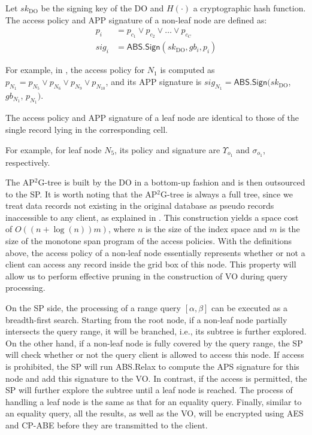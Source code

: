 \begin{definition}
  Let ${sk}_{\textrm{DO}}$ be the signing key of the DO and $H(\cdot)$ a cryptographic hash function. The access policy and APP signature of a non-leaf node are defined as:
  \begin{align*}
    p_i   & = p_{c_1}  \lor  p_{c_2}  \lor  \dots  \lor  p_{c_C} \\
    sig_i & = \textsf{ABS.Sign}({sk}_{\textrm{DO}}, gb_i , p_i)
  \end{align*}
\end{definition}
For example, in , the access policy for $N_1$ is computed as $p_{N_1} = p_{N_5} \lor p_{N_6} \lor p_{N_9} \lor p_{N_{10}}$, and its APP signature is $sig_{N_1} = \textsf{ABS.Sign}({sk}_{\textrm{DO}}$, $gb_{N_1}$, $p_{N_1})$.

\begin{definition}
  The access policy and APP signature of a leaf node are identical to those of the single record lying in the corresponding cell.
\end{definition}
For example, for leaf node $N_5$, its policy and signature are $\Upsilon_{o_1}$ and $\sigma_{o_1}$, respectively.

The AP$^2$G-tree is built by the DO in a bottom-up fashion and is then outsourced to the SP\@.
It is worth noting that the AP$^2$G-tree is always a full tree, since we treat data records not existing in the original database as pseudo records inaccessible to any client, as explained in . This construction yields a space cost of $O((n + \log(n))m)$, where $n$ is the size of the index space and $m$ is the size of the monotone span program of the access policies. With the definitions above, the access policy of a non-leaf node essentially represents whether or not a client can access any record inside the grid box of this node. This property will allow us to perform effective pruning in the construction of VO during query processing.

On the SP side, the processing of a range query $[\alpha,\beta]$ can be executed as a breadth-first search. Starting from the root node, if a non-leaf node partially intersects the query range, it will be branched, i.e., its subtree is further explored. On the other hand, if a non-leaf node is fully covered by the query range, the SP will check whether or not the query client is allowed to access this node. If access is prohibited, the SP will run \textsf{ABS.Relax} to compute the APS signature for this node and add this signature to the VO\@. In contrast, if the access is permitted, the SP will further explore the subtree until a leaf node is reached. The process of handling a leaf node is the same as that for an equality query. Finally, similar to an equality query, all the results, as well as the VO, will be encrypted using AES and CP-ABE before they are transmitted to the client.

